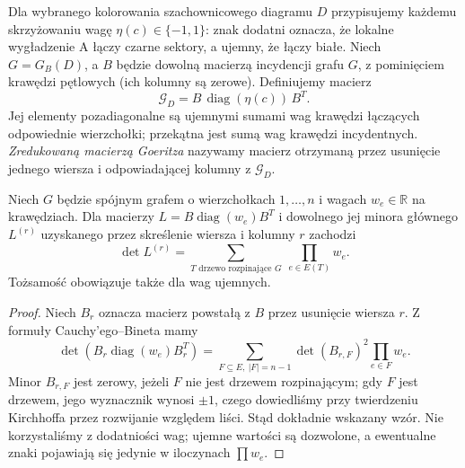 \begin{definicja}
Dla wybranego kolorowania szachownicowego diagramu $D$
przypisujemy każdemu skrzyżowaniu wagę
$\eta(c)\in\{-1,1\}$: znak dodatni oznacza,
że lokalne wygładzenie A łączy czarne sektory,
a ujemny, że łączy białe. Niech $G=G_B(D)$, a
$B$ będzie dowolną macierzą incydencji grafu $G$,
z pominięciem krawędzi pętlowych (ich kolumny są zerowe).
Definiujemy macierz
\[
\mathcal G_D=B\,\operatorname{diag}(\eta(c))\,B^T.
\]
Jej elementy pozadiagonalne są ujemnymi sumami wag
krawędzi łączących odpowiednie wierzchołki; przekątna
jest sumą wag krawędzi incydentnych. \emph{Zredukowaną
macierzą Goeritza} nazywamy macierz otrzymaną przez
usunięcie jednego wiersza i odpowiadającej kolumny
z $\mathcal G_D$.
\end{definicja}

\begin{stwierdzenie}
Niech $G$ będzie spójnym grafem o wierzchołkach
$1,\ldots,n$ i wagach $w_e\in\mathbb R$ na krawędziach.
Dla macierzy $L=B\operatorname{diag}(w_e)B^T$
i dowolnego jej minora głównego $L^{(r)}$
uzyskanego przez skreślenie wiersza i kolumny $r$
zachodzi
\[
\det L^{(r)}=\sum_{T\text{ drzewo rozpinające }G}
\ \prod_{e\in E(T)}w_e.
\]
Tożsamość obowiązuje także dla wag ujemnych.
\end{stwierdzenie}
\begin{proof}
Niech $B_r$ oznacza macierz powstałą z $B$ przez
usunięcie wiersza $r$. Z formuły Cauchy'ego--Bineta
mamy
\[
\det(B_r\operatorname{diag}(w_e)B_r^T)
=\sum_{F\subseteq E,\ |F|=n-1}
\det(B_{r,F})^2\prod_{e\in F}w_e.
\]
Minor $B_{r,F}$ jest zerowy, jeżeli $F$ nie jest
drzewem rozpinającym; gdy $F$ jest drzewem,
jego wyznacznik wynosi $\pm1$, czego dowiedliśmy
przy twierdzeniu Kirchhoffa przez rozwijanie
względem liści. Stąd dokładnie wskazany wzór.
Nie korzystaliśmy z dodatniości wag; ujemne wartości
są dozwolone, a ewentualne znaki pojawiają się jedynie
w iloczynach $\prod w_e$.
\end{proof}

